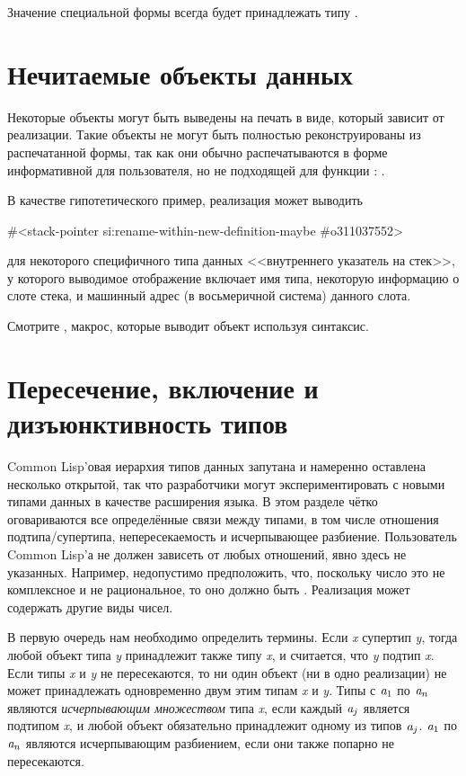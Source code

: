 Значение специальной формы  всегда будет принадлежать типу .

\section{Нечитаемые объекты данных}

Некоторые объекты могут быть выведены на печать в виде, который зависит от
реализации.
Такие объекты не могут быть полностью реконструированы из распечатанной формы,
так как они обычно распечатываются в форме информативной для пользователя, но не
подходящей для функции :
.

В качестве гипотетического пример, реализация может выводить 
\begin{lisp}
\#<stack-pointer si:rename-within-new-definition-maybe \#o311037552>
\end{lisp}
для некоторого специфичного типа данных <<внутреннего указатель на стек>>, у
которого выводимое отображение включает имя типа, некоторую информацию о слоте
стека, и машинный адрес (в восьмеричной система) данного слота.

Смотрите , макрос, которые выводит объект используя
\cd{\#<} синтаксис.

\section{Пересечение, включение и дизъюнктивность типов}
\label{DATA-TYPE-RELATIONSHIPS}

Common Lisp'овая иерархия типов данных запутана и намеренно оставлена несколько
открытой, так что разработчики могут экспериментировать с новыми типами данных в
качестве расширения языка. В этом разделе чётко оговариваются все
определённые связи между типами, в том числе отношения подтипа/супертипа,
непересекаемость и исчерпывающее разбиение. Пользователь Common Lisp'а
не должен зависеть от любых отношений, явно здесь не указанных.
Например, недопустимо предположить, что, поскольку число
это не комплексное и не рациональное, то оно должно быть . Реализация
может содержать другие виды чисел.

В первую очередь нам необходимо определить термины.
Если \emph{x} супертип \emph{y}, тогда любой объект типа \emph{y} принадлежит
также типу \emph{x}, и считается, что \emph{y} подтип \emph{x}. Если типы
\emph{x} и \emph{y} не пересекаются, то ни один объект (ни в одно реализации) не
может принадлежать одновременно двум этим типам \emph{x} и \emph{y}. Типы
с $\emph{a}_1$ по $\emph{a}_{n}$ являются \emph{исчерпывающим множеством} типа
\emph{x}, если каждый $\emph{a}_j$ является подтипом \emph{x}, и любой объект
обязательно принадлежит одному из типов $\emph{a}_{j}$.
$\emph{a}_1$ по $\emph{a}_{n}$ являются исчерпывающим разбиением, если они также
попарно не пересекаются.

